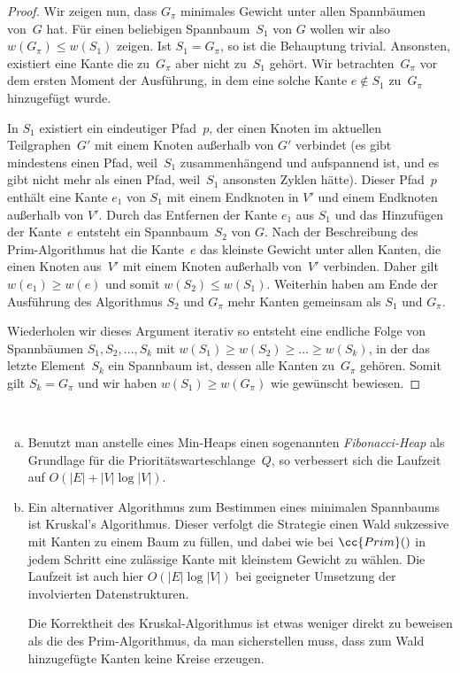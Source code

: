 \begin{proof}
Wir zeigen nun, dass $G_\pi$ minimales Gewicht unter allen Spannbäumen von~$G$ hat.
Für einen beliebigen Spannbaum~$S_1$ von $G$ wollen wir also $w(G_\pi) \le w(S_1)$ zeigen.
Ist $S_1=G_\pi$, so ist die Behauptung trivial. 
Ansonsten, existiert eine Kante die zu~$G_\pi$ aber nicht zu~$S_1$ gehört.
Wir betrachten~$G_\pi$ vor dem ersten Moment der Ausführung, in dem eine solche Kante $e \not\in S_1$ zu~$G_\pi$ hinzugefügt wurde. 
	
In $S_1$ existiert ein eindeutiger Pfad~$p$, der einen Knoten im aktuellen Teilgraphen~$G'$ mit einem Knoten außerhalb von $G'$ verbindet (es gibt mindestens einen Pfad, weil~$S_1$ zusammenhängend und aufspannend ist, und es gibt nicht mehr als einen Pfad, weil~$S_1$ ansonsten Zyklen hätte).
Dieser Pfad~$p$ enthält eine Kante $e_1$ von $S_1$ mit einem Endknoten in $V'$ und einem Endknoten außerhalb von $V'$.
Durch das Entfernen der Kante $e_1$ aus $S_1$ und das Hinzufügen der Kante~$e$ entsteht ein Spannbaum~$S_2$ von $G$. 
Nach der Beschreibung des Prim-Algorithmus hat die Kante~$e$ das kleinste Gewicht unter allen Kanten, die einen Knoten aus~$V'$ mit einem Knoten außerhalb von~$V'$ verbinden.
Daher gilt $w(e_1) \ge w(e)$ und somit $w(S_2) \le w(S_1)$.
Weiterhin haben am Ende der Ausführung des Algorithmus $S_2$ und $G_\pi$ mehr Kanten gemeinsam als $S_1$ und $G_\pi$.

Wiederholen wir dieses Argument iterativ so entsteht eine endliche Folge von Spannbäumen $S_1, S_2,\ldots, S_k$ mit $w(S_1) \ge w(S_2) \ge \ldots \geq w(S_k)$, in der das letzte Element~$S_k$ ein Spannbaum ist, dessen alle Kanten zu~$G_\pi$ gehören.
Somit gilt $S_k=G_\pi$ und wir haben $w(S_1) \ge w(G_\pi)$ wie gewünscht bewiesen.
\end{proof}


\begin{remark}\
\begin{enumerate}[(a)]
 \item Benutzt man anstelle eines Min-Heaps einen sogenannten \emph{Fibonacci-Heap} als Grundlage für die Prioritätswarteschlange~$Q$, so verbessert sich die Laufzeit auf $O(|E|+|V|\log|V|)$.

 \item Ein alternativer Algorithmus zum Bestimmen eines minimalen Spannbaums ist Kruskal's Algorithmus.
Dieser verfolgt die Strategie einen Wald sukzessive mit Kanten zu einem Baum zu füllen, und dabei wie bei $\cc{Prim}()$ in jedem Schritt eine zulässige Kante mit kleinstem Gewicht zu wählen.
Die Laufzeit ist auch hier $O(|E|\log|V|)$ bei geeigneter Umsetzung der involvierten Datenstrukturen.

Die Korrektheit des Kruskal-Algorithmus ist etwas weniger direkt zu beweisen als die des Prim-Algorithmus, da man sicherstellen muss, dass zum Wald hinzugefügte Kanten keine Kreise erzeugen.

\end{enumerate}
\end{remark}